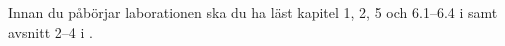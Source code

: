 Innan du påbörjar laborationen ska du ha läst kapitel 1, 2, 5 och 6.1--6.4 
i \cite{Brookshear2012csa} samt avsnitt 2--4 i  
\cite{pythonkramaren1}.
